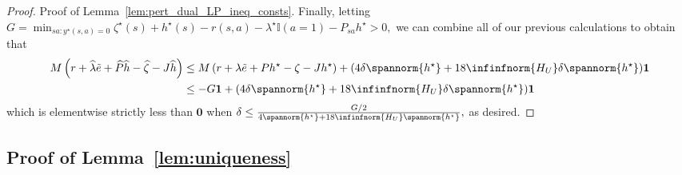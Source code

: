 \documentclass[mnsc,nonblindrev]{informs3}
\newcommand{\Phat}{\widehat{P}}
\newcommand{\one}{\mathbf{1}}
\newcommand{\hhat}{\widehat{h}}
\newcommand{\zero}{\mathbf{0}}
\newcommand{\zetahat}{\widehat{\zeta}}
\newcommand{\lambdahat}{\widehat{\lambda}}
\begin{document}
\begin{APPENDICES}
\begin{proof}{Proof of Lemma~\ref{lem:pert_dual_LP_ineq_consts}.}
Finally, letting
$
    G = \min_{sa:y^\star(s,a)=0} \zeta^\star(s) +  h^\star(s) -r(s, a) - \lambda^\star \mathbb{I}(a=1) - P_{s a}h^\star > 0,
$
we can combine all of our previous calculations to obtain that
\begin{align*}
    M \left( r + \lambdahat \Tilde{e} + \Phat\hhat - \zetahat - J \hhat \right) 
    & \leq M \left(r +  \lambda \Tilde{e} + Ph^\star - \zeta - J h^\star \right) + (4 \delta \spannorm{h^\star} + 18\infinfnorm{H_U} \delta \spannorm{h^\star})\one \\
    & \leq -G \one + (4 \delta \spannorm{h^\star} + 18\infinfnorm{H_U} \delta \spannorm{h^\star})\one
\end{align*}
which is elementwise strictly less than $\zero$ when
$
    \delta \leq \frac{G/2}{4  \spannorm{h^\star} + 18\infinfnorm{H_U}  \spannorm{h^\star}},
$
as desired.
\end{proof}


\subsection{Proof of Lemma~\ref{lem:uniqueness}}\label{subsec:pr-uniqueness}


\end{APPENDICES}
\end{document}
